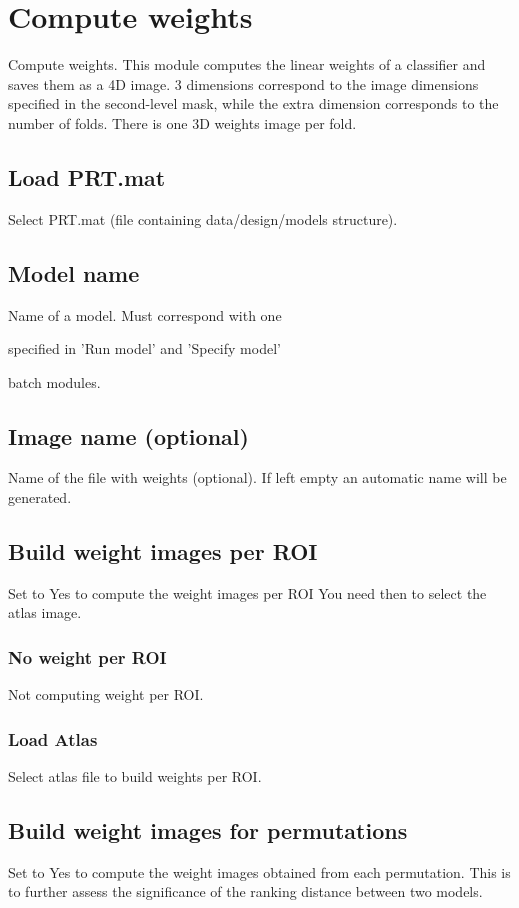 
\chapter{Compute weights  \label{Chap:weights}}

\vskip 1.5cm

Compute weights. This module computes the linear weights of a classifier and saves them as a 4D image. 3 dimensions correspond to the image dimensions specified in the second-level mask, while the extra dimension corresponds to the number of folds. There is one 3D weights image per fold.


\section{Load PRT.mat}
Select PRT.mat (file containing data/design/models structure).


\section{Model name}
Name of a model. Must correspond with one 

specified in 'Run model' and 'Specify model'

batch modules.


\section{Image name (optional)}
Name of the file with weights (optional). If left empty  an automatic name will be generated.


\section{Build weight images per ROI}
Set to Yes to compute the weight images per ROI You need then to select the atlas image.


\subsection{No weight per ROI}
Not computing weight per ROI.


\subsection{Load Atlas}
Select atlas file to build weights per ROI.


\section{Build weight images for permutations}
Set to Yes to compute the weight images obtained from each permutation. This is to further assess the significance of the ranking distance between two models.

